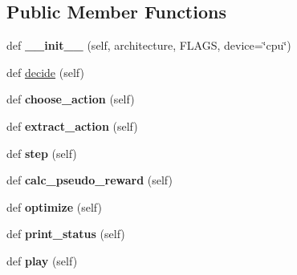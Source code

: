 \subsection*{Public Member Functions}
\begin{DoxyCompactItemize}
\item 
\mbox{\label{classAgency_1_1BaseAgent_a8000d3852f7eada76fd862a036e8c5ac}} 
def {\bfseries \+\_\+\+\_\+init\+\_\+\+\_\+} (self, architecture, F\+L\+A\+GS, device=\char`\"{}cpu\char`\"{})
\item 
def \mbox{\hyperlink{classAgency_1_1BaseAgent_a901aab539081be07996dca97de2f2e06}{decide}} (self)
\item 
\mbox{\label{classAgency_1_1BaseAgent_a1f7d1b84d919eb3d2ce9092ad2161d1b}} 
def {\bfseries choose\+\_\+action} (self)
\item 
\mbox{\label{classAgency_1_1BaseAgent_a06cd034442fe41432486654dfafa0937}} 
def {\bfseries extract\+\_\+action} (self)
\item 
\mbox{\label{classAgency_1_1BaseAgent_a59f2f9a055e2c145bc83f610e26b8096}} 
def {\bfseries step} (self)
\item 
\mbox{\label{classAgency_1_1BaseAgent_a663f1d2913fa6a467077a55ddf854dae}} 
def {\bfseries calc\+\_\+pseudo\+\_\+reward} (self)
\item 
\mbox{\label{classAgency_1_1BaseAgent_adef4f441aa6cbd1f3bb2c85839b9f403}} 
def {\bfseries optimize} (self)
\item 
\mbox{\label{classAgency_1_1BaseAgent_a9cb7dd560c63c2fe8d1967568b6a82ed}} 
def {\bfseries print\+\_\+status} (self)
\item 
\mbox{\label{classAgency_1_1BaseAgent_aa06a4883d4637c0fdfca1d8d37f94069}} 
def {\bfseries play} (self)
\end{DoxyCompactItemize}
